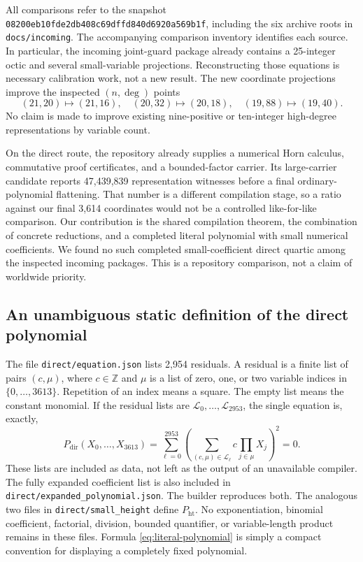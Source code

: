 \documentclass[11pt,letterpaper]{article}
\newcommand{\Z}{\mathbb Z}
\newcommand{\file}[1]{\nolinkurl{#1}}
\newcommand{\pin}{\texttt{08200eb10fde2db408c69dffd840d6920a569b1f}}
\begin{document}
All comparisons refer to the snapshot \pin, including the six archive
roots in \file{docs/incoming}. The accompanying comparison inventory
identifies each source. In particular, the incoming joint-guard package
already contains a 25-integer octic and several small-variable projections.
Reconstructing those equations is necessary calibration work, not a new
result. The new coordinate projections improve the inspected
$(n,\deg)$ points
\[
 (21,20)\mapsto(21,16),\quad
 (20,32)\mapsto(20,18),\quad
 (19,88)\mapsto(19,40).
\]
No claim is made to improve existing nine-positive or ten-integer
high-degree representations by variable count.

On the direct route, the repository already supplies a numerical Horn
calculus, commutative proof certificates, and a bounded-factor carrier.
Its large-carrier candidate reports 47,439,839 representation witnesses
before a final ordinary-polynomial flattening. That number is a different
compilation stage, so a ratio against our final 3,614 coordinates would
not be a controlled like-for-like comparison. Our contribution is the
shared compilation theorem, the combination of concrete reductions,
and a completed literal polynomial with small numerical coefficients.
We found no such completed small-coefficient direct quartic among the
inspected incoming packages. This is a repository comparison, not a claim
of worldwide priority.

\subsection{An unambiguous static definition of the direct polynomial}

The file \file{direct/equation.json} lists 2,954 residuals. A residual is
a finite list of pairs $(c,\mu)$, where $c\in\Z$ and $\mu$ is a list of
zero, one, or two variable indices in $\{0,\ldots,3613\}$. Repetition of
an index means a square. The empty list means the constant monomial.
If the residual lists are $\mathcal L_0,\ldots,\mathcal L_{2953}$, the
single equation is, exactly,
\begin{equation}\label{eq:literal-polynomial}
 P_{\mathrm{dir}}(X_0,\ldots,X_{3613})
 =
 \sum_{\ell=0}^{2953}
 \left(\sum_{(c,\mu)\in\mathcal L_\ell}
          c\prod_{j\in\mu}X_j\right)^2=0.
\end{equation}
These lists are included as data, not left as the output of an unavailable
compiler. The fully expanded coefficient list is also included in
\file{direct/expanded_polynomial.json}. The builder reproduces both.
The analogous two files in \file{direct/small_height} define
$P_{\mathrm{ht}}$. No exponentiation, binomial coefficient, factorial,
division, bounded quantifier, or variable-length product remains in these
files. Formula \eqref{eq:literal-polynomial} is simply a compact convention
for displaying a completely fixed polynomial.
\end{document}
